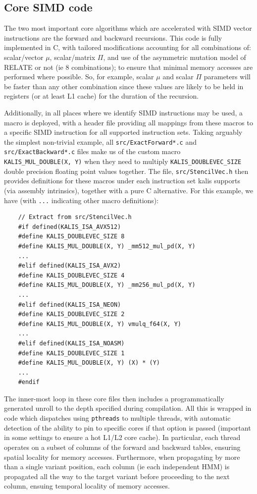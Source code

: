 \documentclass[pdflatex,referee,lineno,sn-nature]{sn-jnl}%
\let\proglang=\textsf
\newcommand{\pkg}[1]{{\fontseries{m}\fontseries{b}\selectfont #1}}
\begin{document}
\subsection*{Core SIMD code}
\label{core-simd-code}

The two most important core algorithms which are accelerated with SIMD vector instructions are the forward and backward recursions.
This code is fully implemented in \proglang{C}, with tailored modifications accounting for all combinations of: scalar/vector \(\mu\), scalar/matrix \(\Pi\), and use of the asymmetric mutation model of RELATE \cite{speidel} or not (ie 8 combinations); to ensure that minimal memory accesses are performed where possible.
So, for example, scalar \(\mu\) and scalar \(\Pi\) parameters will be faster than any other combination since these values are likely to be held in registers (or at least L1 cache) for the duration of the recursion.

Additionally, in all places where we identify SIMD instructions may be used, a macro is deployed, with a header file providing all mappings from these macros to a specific SIMD instruction for all supported instruction sets.
Taking arguably the simplest non-trivial example, all \texttt{src/ExactForward*.c} and \texttt{src/ExactBackward*.c} files make us of the custom macro \texttt{KALIS\_MUL\_DOUBLE(X,\ Y)} when they need to multiply \texttt{KALIS\_DOUBLEVEC\_SIZE} double precision floating point values together.
The file, \texttt{src/StencilVec.h} then provides definitions for these macros under each instruction set \pkg{kalis} supports (via assembly intrinsics), together with a pure \proglang{C} alternative.
For this example, we have (with \texttt{...} indicating other macro definitions):

\begin{verbatim}
	// Extract from src/StencilVec.h
	#if defined(KALIS_ISA_AVX512)
	#define KALIS_DOUBLEVEC_SIZE 8
	#define KALIS_MUL_DOUBLE(X, Y) _mm512_mul_pd(X, Y)
	...
	#elif defined(KALIS_ISA_AVX2)
	#define KALIS_DOUBLEVEC_SIZE 4
	#define KALIS_MUL_DOUBLE(X, Y) _mm256_mul_pd(X, Y)
	...
	#elif defined(KALIS_ISA_NEON)
	#define KALIS_DOUBLEVEC_SIZE 2
	#define KALIS_MUL_DOUBLE(X, Y) vmulq_f64(X, Y)
	...
	#elif defined(KALIS_ISA_NOASM)
	#define KALIS_DOUBLEVEC_SIZE 1
	#define KALIS_MUL_DOUBLE(X, Y) (X) * (Y)
	...
	#endif
\end{verbatim}

The inner-most loop in these core files then includes a programmatically generated unroll to the depth specified during compilation.
All this is wrapped in code which dispatches using \texttt{pthreads} to multiple threads, with automatic detection of the ability to pin to specific cores if that option is passed (important in some settings to ensure a hot L1/L2 core cache).
In particular, each thread operates on a subset of columns of the forward and backward tables, ensuring spatial locality for memory accesses.
Furthermore, when propagating by more than a single variant position, each column (ie each independent HMM) is propagated all the way to the target variant before proceeding to the next column, ensuing temporal locality of memory accesses.
\end{document}
